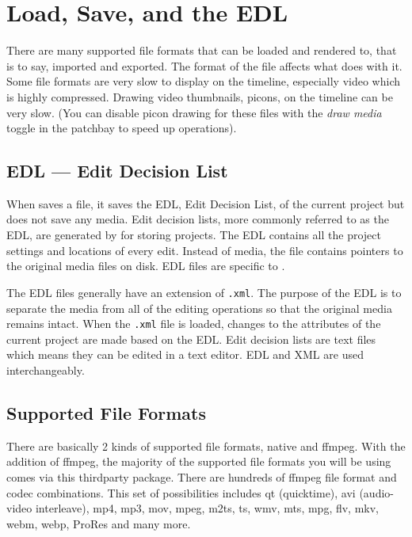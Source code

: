 \chapter{Load, Save, and the EDL}%
\label{cha:load_save_and_the_EDL}

There are many supported file formats that can be loaded and rendered to, that is to say, imported and exported. 
The format of the file affects what \CGG{} does with it.  
Some file formats are very slow to display on the timeline, especially video which is highly compressed.  
Drawing video thumbnails, picons, on the timeline can be very slow.  (You can disable picon drawing for these files with the \textit{draw media} toggle in the patchbay to speed up operations).

\section{EDL --- Edit Decision List}%
\label{sec:edl_edit_decision_list}

When \CGG{} saves a file, it saves the EDL, Edit Decision List, of the current project but does not save any media. 
Edit decision lists, more commonly referred to as the EDL, are generated by \CGG{} for storing projects.  
The EDL contains all the project settings and locations of every edit. 
Instead of media, the file contains pointers to the original media files on disk.  
EDL files are specific to \CGG{}.    

The EDL files generally have an extension of \texttt{.xml}.  
The purpose of the EDL is to separate the media from all of the editing operations so that the original media remains intact. 
When the \texttt{.xml} file is loaded, changes to the attributes of the current project are made based on the EDL\@. Edit decision lists are text files which means they can be edited in a text editor.  EDL and XML are used interchangeably.

\section{Supported File Formats}%
\label{sec:supported_file_formats}

There are basically 2 kinds of supported file formats, native and ffmpeg.  With the addition of ffmpeg, the majority of the supported file formats you will be using comes via this thirdparty package.  There are hundreds of ffmpeg file format and codec combinations. This set of possibilities includes qt (quicktime), avi (audio-video interleave),  mp4, mp3, mov, mpeg, m2ts, ts, wmv, mts, mpg, flv, mkv, webm, webp, ProRes and many more.

